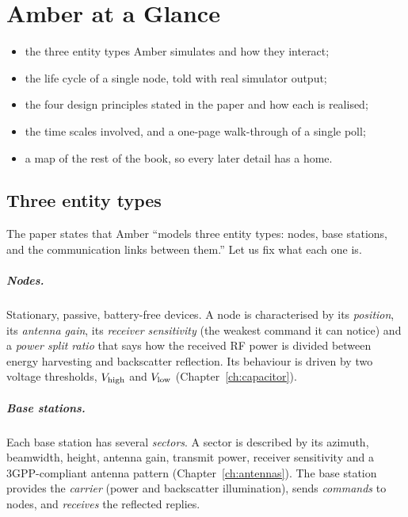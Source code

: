\chapter{Amber at a Glance}
\label{ch:overview}

\begin{defbox}
\begin{itemize}
 \item the three entity types Amber simulates and how they interact;
 \item the life cycle of a single node, told with real simulator output;
 \item the four design principles stated in the paper and how each is realised;
 \item the time scales involved, and a one-page walk-through of a single poll;
 \item a map of the rest of the book, so every later detail has a home.
\end{itemize}
\end{defbox}

\section{Three entity types}

The paper states that Amber ``models three entity types: nodes, base stations,
and the communication links between them.'' Let us fix what each one is.

\paragraph{Nodes.} Stationary, passive, battery-free devices. A node is
characterised by its \emph{position}, its \emph{antenna gain}, its
\emph{receiver sensitivity} (the weakest command it can notice) and a
\emph{power split ratio} that says how the received RF power is divided
between energy harvesting and backscatter reflection. Its behaviour is driven
by two voltage thresholds, $V_{\mathrm{high}}$ and $V_{\mathrm{low}}$ (Chapter~\ref{ch:capacitor}).

\paragraph{Base stations.} Each base station has several \emph{sectors}. A
sector is described by its azimuth, beamwidth, height, antenna gain, transmit
power, receiver sensitivity and a 3GPP-compliant antenna pattern
(Chapter~\ref{ch:antennas}). The base station provides the \emph{carrier} (power
and backscatter illumination), sends \emph{commands} to nodes, and
\emph{receives} the reflected replies.


